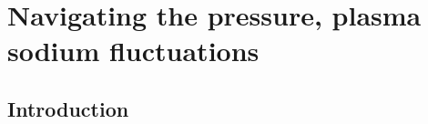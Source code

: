 \chapter[Navigating the pressure, plasma sodium fluctuations]{Navigating the pressure, plasma sodium fluctuations}

\section {Introduction}